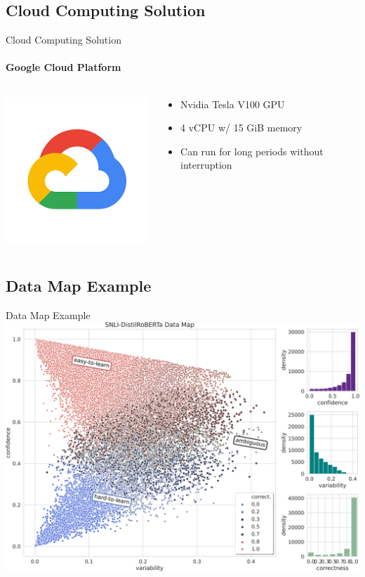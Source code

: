 \documentclass[
	11pt,
]{beamer}
\begin{document}
\subsection{Cloud Computing Solution}
\begin{frame}{Cloud Computing Solution}
	\framesubtitle{Google Cloud Platform}
	\begin{columns}
		\begin{column}{.4\textwidth}

			\includegraphics[scale=0.6]{gcp.png}
		\end{column}
		\begin{column}{.6\textwidth}
			\begin{itemize}
				\item Nvidia Tesla V100 GPU
				\item 4 vCPU w/ 15 GiB memory
				\item Can run for long periods without interruption
			\end{itemize}
		\end{column}
	\end{columns}
\end{frame}

\subsection{Data Map Example}
\begin{frame}[t]{Data Map Example}
	\centering
	\includegraphics{data_map.png}
\end{frame}
\end{document}
